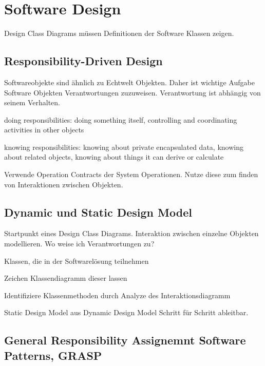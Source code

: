 \chapter{Software Design}
Design Class Diagrams müssen Definitionen der Software Klassen zeigen.

\section{Responsibility-Driven Design}

Softwareobjekte sind ähnlich zu Echtwelt Objekten. Daher ist wichtige Aufgabe Software Objekten
Verantwortungen zuzuweisen. Verantwortung ist abhängig von seinem Verhalten.
\begin{compactitem}
    \item doing responsibilities: doing something itself, controlling and coordinating activities
    in other objects
    \item knowing responsibilities: knowing about private encapsulated data, knowing about related
    objects, knowing about things it can derive or calculate
\end{compactitem}

Verwende Operation Contracts der System Operationen. Nutze diese zum finden von Interaktionen zwischen
Objekten.

\section{Dynamic und Static Design Model}

Startpunkt eines Design Class Diagrams.
Interaktion zwischen einzelne Objekten modellieren. Wo weise ich Verantwortungen zu?
\begin{compactenum}
    \item Klassen, die in der Softwarelösung teilnehmen
    \item Zeichen Klassendiagramm dieser lassen
    \item Identifiziere Klassenmethoden durch Analyze des Interaktionsdiagramm
\end{compactenum}

Static Design Model aus Dynamic Design Model Schritt für Schritt ableitbar.

\section{General Responsibility Assignemnt Software Patterns, GRASP}

